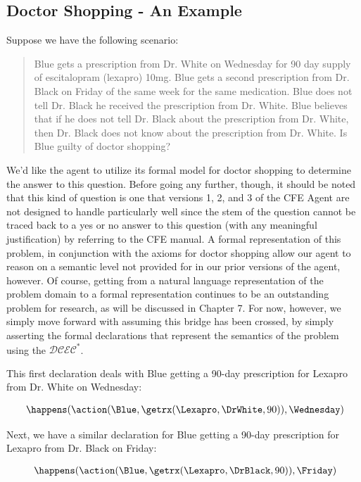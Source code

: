 \subsection{Doctor Shopping - An Example}

Suppose we have the following scenario:
\blockquote{Blue gets a prescription from Dr. White on Wednesday for 90 day supply of escitalopram (lexapro) 10mg.  Blue gets a second prescription from Dr. Black on Friday of the same week for the same medication.  Blue does not tell Dr. Black he received the prescription from Dr. White.  Blue believes that if he does not tell Dr. Black about the prescription from Dr. White, then Dr. Black does not know about the prescription from Dr. White.  Is Blue guilty of doctor shopping?}

We'd like the agent to utilize its formal model for doctor shopping to determine the answer to this question.  Before going any further, though, it should be noted that this kind of question is one that versions 1, 2, and 3 of the CFE Agent are not designed to handle particularly well since the stem of the question cannot be traced back to a yes or no answer to this question (with any meaningful justification) by referring to the CFE manual.  A formal representation of this problem, in conjunction with the axioms for doctor shopping allow our agent to reason on a semantic level not provided for in our prior versions of the agent, however.  Of course, getting from a natural language representation of the problem domain to a formal representation continues to be an outstanding problem for research, as will be discussed in Chapter 7.  For now, however, we simply move forward with assuming this bridge has been crossed, by simply asserting the formal declarations that represent the semantics of the problem using the $\mathcal{DCEC}^\ast$.

This first declaration deals with Blue getting a 90-day prescription for Lexapro from Dr. White on Wednesday: 

\begin{footnotesize}
\begin{align*}
[D1] \ \happens(\action(\Blue,\getrx(\Lexapro,\DrWhite,90)),\Wednesday)
\end{align*}
\end{footnotesize}

\noindent Next, we have a similar declaration for Blue getting a 90-day prescription for Lexapro from Dr. Black on Friday:
\begin{footnotesize}
\begin{align*}
[D2] \ \happens(\action(\Blue,\getrx(\Lexapro,\DrBlack,90)),\Friday)
\end{align*}
\end{footnotesize}

